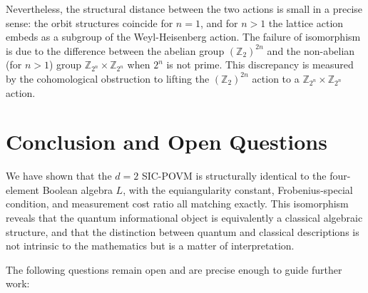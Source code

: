 \documentclass{article}
\begin{document}
Nevertheless, the structural distance between the two actions is small in a precise sense: the orbit structures coincide for $n=1$, and for $n>1$ the lattice action embeds as a subgroup of the Weyl-Heisenberg action. The failure of isomorphism is due to the difference between the abelian group $(\mathbb{Z}_2)^{2n}$ and the non-abelian (for $n>1$) group $\mathbb{Z}_{2^n} \times \mathbb{Z}_{2^n}$ when $2^n$ is not prime. This discrepancy is measured by the cohomological obstruction to lifting the $(\mathbb{Z}_2)^{2n}$ action to a $\mathbb{Z}_{2^n} \times \mathbb{Z}_{2^n}$ action.

\section{Conclusion and Open Questions}

We have shown that the $d=2$ SIC-POVM is structurally identical to the four-element Boolean algebra $L$, with the equiangularity constant, Frobenius-special condition, and measurement cost ratio all matching exactly. This isomorphism reveals that the quantum informational object is equivalently a classical algebraic structure, and that the distinction between quantum and classical descriptions is not intrinsic to the mathematics but is a matter of interpretation.

The following questions remain open and are precise enough to guide further work:
\end{document}
